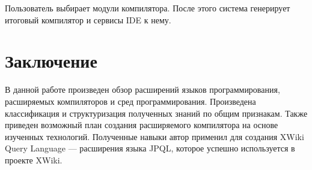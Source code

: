 \documentclass[a4paper,12pt,titlepage]{extarticle}
\begin{document}
Пользователь выбирает модули компилятора. После этого система генерирует
итоговый компилятор и сервисы IDE к нему.

\section{Заключение}

В данной работе произведен обзор расширений языков программирования,
расширяемых компиляторов и сред программирования. Произведена классификация и
структуризация полученных знаний по общим признакам. Также приведен возможный
план создания расширяемого компилятора на основе изученных технологий.
Полученные навыки автор применил для создания XWiki Query Language ---
расширения языка JPQL, которое успешно используется в проекте XWiki.
 
\small



\end{document}
